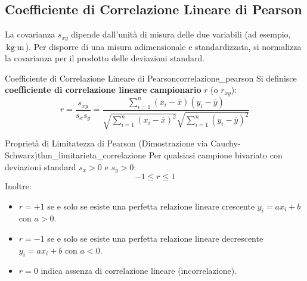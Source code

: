 \subsection{Coefficiente di Correlazione Lineare di Pearson}

La covarianza $s_{xy}$ dipende dall'unità di misura delle due variabili (ad esempio, $\text{kg} \cdot \text{m}$). Per disporre di una misura adimensionale e standardizzata, si normalizza la covarianza per il prodotto delle deviazioni standard.

\begin{definizione}{Coefficiente di Correlazione Lineare di Pearson}{correlazione_pearson}
Si definisce \textbf{coefficiente di correlazione lineare campionario} $r$ (o $r_{xy}$):
\begin{equation}
r = \frac{s_{xy}}{s_x s_y} = \frac{\sum_{i=1}^n (x_i - \overline{x})(y_i - \overline{y})}{\sqrt{\sum_{i=1}^n (x_i - \overline{x})^2}\sqrt{\sum_{i=1}^n (y_i - \overline{y})^2}}
\end{equation}
\end{definizione}

\begin{teorema}{Proprietà di Limitatezza di Pearson (Dimostrazione via Cauchy-Schwarz)}{thm_limitarieta_correlazione}
Per qualsiasi campione bivariato con deviazioni standard $s_x > 0$ e $s_y > 0$:
\begin{equation}
-1 \le r \le 1
\end{equation}
Inoltre:
\begin{itemize}
    \item $r = +1$ se e solo se esiste una perfetta relazione lineare crescente $y_i = a x_i + b$ con $a > 0$.
    \item $r = -1$ se e solo se esiste una perfetta relazione lineare decrescente $y_i = a x_i + b$ con $a < 0$.
    \item $r = 0$ indica assenza di correlazione lineare (incorrelazione).
\end{itemize}
\end{teorema}


